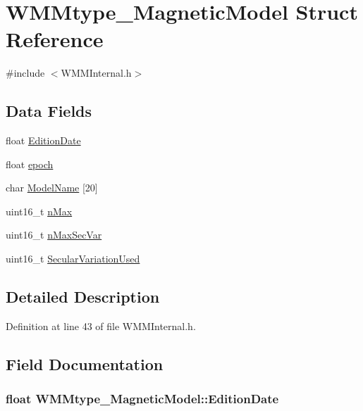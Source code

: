 \hypertarget{struct_w_m_mtype___magnetic_model}{\section{\-W\-M\-Mtype\-\_\-\-Magnetic\-Model \-Struct \-Reference}
\label{struct_w_m_mtype___magnetic_model}
}


{\ttfamily \#include $<$\-W\-M\-M\-Internal.\-h$>$}

\subsection*{\-Data \-Fields}
\begin{DoxyCompactItemize}
\item 
float \hyperlink{struct_w_m_mtype___magnetic_model_ac71e1248c6059e2808a805c55977b143}{\-Edition\-Date}
\item 
float \hyperlink{struct_w_m_mtype___magnetic_model_a49af71fa7bdc1e238de0f59b941ab70c}{epoch}
\item 
char \hyperlink{struct_w_m_mtype___magnetic_model_a11d5a44016770e140c397467b40c7755}{\-Model\-Name} \mbox{[}20\mbox{]}
\item 
uint16\-\_\-t \hyperlink{struct_w_m_mtype___magnetic_model_ad87a370d713ab72ff5ca801d1a3a2d4c}{n\-Max}
\item 
uint16\-\_\-t \hyperlink{struct_w_m_mtype___magnetic_model_a957006fac5ca68a6c677f6f09d0c05b4}{n\-Max\-Sec\-Var}
\item 
uint16\-\_\-t \hyperlink{struct_w_m_mtype___magnetic_model_a75df8ef8af2f06cf375592712bb491d0}{\-Secular\-Variation\-Used}
\end{DoxyCompactItemize}


\subsection{\-Detailed \-Description}


\-Definition at line 43 of file \-W\-M\-M\-Internal.\-h.



\subsection{\-Field \-Documentation}
\hypertarget{struct_w_m_mtype___magnetic_model_ac71e1248c6059e2808a805c55977b143}{
\subsubsection[{\-Edition\-Date}]{\setlength{\rightskip}{0pt plus 5cm}float {\bf \-W\-M\-Mtype\-\_\-\-Magnetic\-Model\-::\-Edition\-Date}}}\label{struct_w_m_mtype___magnetic_model_ac71e1248c6059e2808a805c55977b143}


